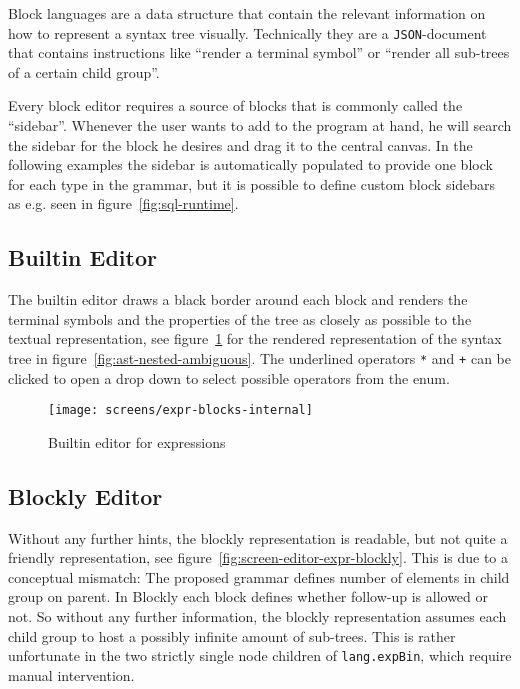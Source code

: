 \documentclass[sigconf,natbib=false,review=true,anonymous]{acmart}
\begin{document}
Block languages are a data structure that contain the relevant information on how to represent a syntax tree visually. Technically they are a \texttt{JSON}-document that contains instructions like \enquote{render a terminal symbol} or \enquote{render all sub-trees of a certain child group}.

Every block editor requires a source of blocks that is commonly called the \enquote{sidebar}. Whenever the user wants to add to the program at hand, he will search the sidebar for the block he desires and drag it to the central canvas. In the following examples the sidebar is automatically populated to provide one block for each type in the grammar, but it is possible to define custom block sidebars as e.g. seen in figure~\ref{fig:sql-runtime}.

\subsection{Builtin Editor}

The builtin editor draws a black border around each block and renders the terminal symbols and the properties of the tree as closely as possible to the textual representation, see figure~\ref{fig:screen-editor-expr-internal} for the rendered representation of the syntax tree in figure~\ref{fig:ast-nested-ambiguous}. The underlined operators \texttt{*} and \texttt{+} can be clicked to open a drop down to select possible operators from the enum.

\begin{figure}
  \texttt{[image: screens/expr-blocks-internal]}
  \caption{Builtin editor for expressions}
  \label{fig:screen-editor-expr-internal}
\end{figure}

\subsection{Blockly Editor}

Without any further hints, the blockly representation is readable, but not quite a friendly representation, see figure~\ref{fig:screen-editor-expr-blockly}. This is due to a conceptual mismatch: The proposed grammar defines number of elements in child group on parent. In Blockly each block defines whether follow-up is allowed or not. So without any further information, the blockly representation assumes each child group to host a possibly infinite amount of sub-trees. This is rather unfortunate in the two strictly single node children of \texttt{lang.expBin}, which require manual intervention.
\end{document}
